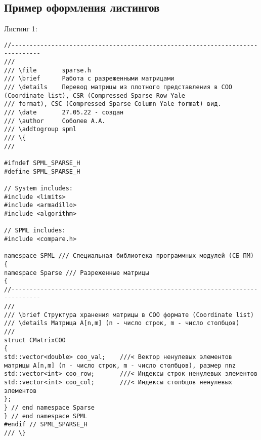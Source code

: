 
\subsection{Пример оформления листингов}

Листинг 1:

\begin{lstlisting}
//------------------------------------------------------------------------------
///
/// \file       sparse.h
/// \brief      Работа с разреженными матрицами
/// \details    Перевод матрицы из плотного представления в COO (Coordinate list), CSR (Compressed Sparse Row Yale
/// format), CSC (Compressed Sparse Column Yale format) вид.
/// \date       27.05.22 - создан
/// \author     Соболев А.А.
/// \addtogroup spml
/// \{
///

#ifndef SPML_SPARSE_H
#define SPML_SPARSE_H

// System includes:
#include <limits>
#include <armadillo>
#include <algorithm>

// SPML includes:
#include <compare.h>

namespace SPML /// Специальная библиотека программных модулей (СБ ПМ)
{
namespace Sparse /// Разреженные матрицы
{
//------------------------------------------------------------------------------
///
/// \brief Структура хранения матрицы в COO формате (Coordinate list)
/// \details Матрица A[n,m] (n - число строк, m - число столбцов)
///
struct CMatrixCOO
{
std::vector<double> coo_val;    ///< Вектор ненулевых элементов матрицы A[n,m] (n - число строк, m - число столбцов), размер nnz
std::vector<int> coo_row;       ///< Индексы строк ненулевых элементов
std::vector<int> coo_col;       ///< Индексы столбцов ненулевых элементов
};
} // end namespace Sparse
} // end namespace SPML
#endif // SPML_SPARSE_H
/// \}
\end{lstlisting}

